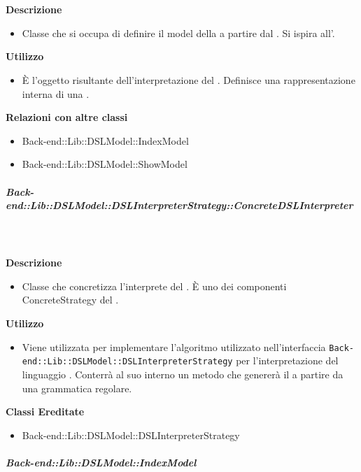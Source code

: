         \textbf{\\ \\ Descrizione} 
          \begin{itemize}
            \item[] Classe che si occupa di definire il model della  a partire dal . Si ispira all'.
          \end{itemize}      
        \textbf{Utilizzo}  
          \begin{itemize}
            \item[] È l'oggetto risultante dell'interpretazione del . Definisce una rappresentazione interna di una .
          \end{itemize}
          \textbf{Relazioni con altre classi}
          \begin{itemize}
              \item{Back-end::Lib::DSLModel::IndexModel}
              \item{Back-end::Lib::DSLModel::ShowModel}
          \end{itemize}
      \subparagraph{Back-end::Lib::DSLModel::DSLInterpreterStrategy::ConcreteDSLInterpreter}
        
        \textbf{\\ \\ Descrizione} 
          \begin{itemize}
            \item[] Classe che concretizza l'interprete del . È uno dei componenti ConcreteStrategy del  .
          \end{itemize}      
        \textbf{Utilizzo}  
          \begin{itemize}
            \item[] Viene utilizzata per implementare l'algoritmo utilizzato nell'interfaccia \texttt{Back-end::Lib::DSLModel::DSLInterpreterStrategy} per l'interpretazione del linguaggio . Conterrà al suo interno un metodo che genererà il  a partire da una grammatica regolare.
          \end{itemize}
          \textbf{Classi Ereditate}
          \begin{itemize}
                \item{Back-end::Lib::DSLModel::DSLInterpreterStrategy}
          \end{itemize}
      \subparagraph{Back-end::Lib::DSLModel::IndexModel}
        
